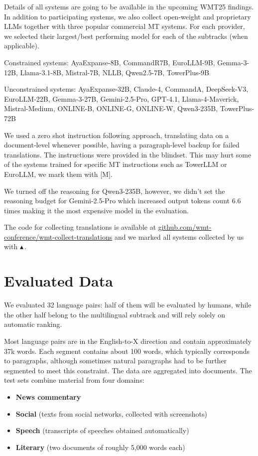 \documentclass[11pt]{article}
\newcommand{\official}{\(\blacktriangle\)\,}
\begin{document}
Details of all systems are going to be available in the upcoming WMT25 findings.
In addition to participating systems, we also collect open-weight and proprietary LLMs together with three popular commercial MT systems. For each provider, we selected their largest/best performing model for each of the subtracks (when applicable).

Constrained systems: 
AyaExpanse-8B, CommandR7B, EuroLLM-9B, Gemma-3-12B, Llama-3.1-8B, Mistral-7B, NLLB, Qwen2.5-7B, TowerPlus-9B

Unconstrained systems: AyaExpanse-32B, Claude-4, CommandA, DeepSeek-V3, EuroLLM-22B, Gemma-3-27B, Gemini-2.5-Pro, GPT-4.1, Llama-4-Maverick, Mistral-Medium, ONLINE-B, ONLINE-G, ONLINE-W, Qwen3-235B, TowerPlus-72B

We used a zero shot instruction following approach, translating data on a document-level whenever possible, having a paragraph-level backup for failed translations. The instructions were provided in the blindset. This may hurt some of the systems trained for specific MT instructions such as TowerLLM or EuroLLM, we mark them with [M].

We turned off the reasoning for Qwen3-235B, however, we didn't set the reasoning budget for Gemini-2.5-Pro which increased output tokens count 6.6 times making it the most expensive model in the evaluation.

The code for collecting translations is available at \href{https://github.com/wmt-conference/wmt-collect-translations}{github.com/wmt-conference/wmt-collect-translations} and we marked all systems collected by us with \official{}.

\section*{Evaluated Data}

We evaluated 32 language pairs: half of them will be evaluated by humans, while the other half belong to the multilingual subtrack and will rely solely on automatic ranking.

Most language pairs are in the English-to-X direction and contain approximately 37k words. Each segment contains about 100 words, which typically corresponds to paragraphs, although sometimes natural paragraphs had to be further segmented to meet this constraint. The data are aggregated into documents. The test sets combine material from four domains:
\begin{itemize}
    \item \textbf{News commentary}
    \item \textbf{Social} (texts from social networks, collected with screenshots)
    \item \textbf{Speech} (transcripts of speeches obtained automatically)
    \item \textbf{Literary} (two documents of roughly 5{,}000 words each)
\end{itemize}
\end{document}
